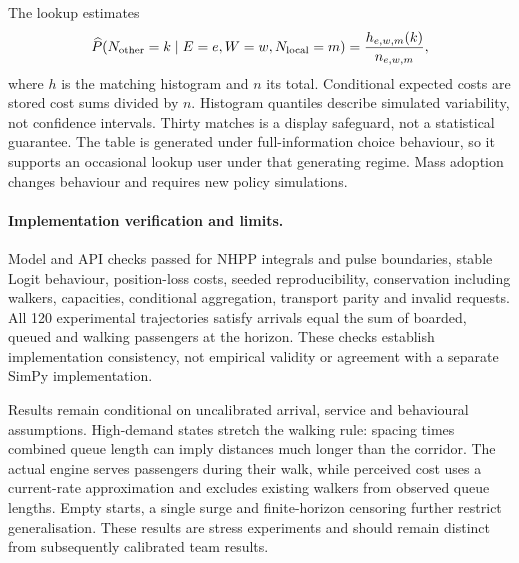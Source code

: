 The lookup estimates
\[
\widehat{P}(N_{\rm other}=k\mid E=e,W=w,N_{\rm local}=m)
=\frac{h_{e,w,m}(k)}{n_{e,w,m}},
\]
where $h$ is the matching histogram and $n$ its total. Conditional expected costs are stored cost sums divided by $n$. Histogram quantiles describe simulated variability, not confidence intervals. Thirty matches is a display safeguard, not a statistical guarantee. The table is generated under full-information choice behaviour, so it supports an occasional lookup user under that generating regime. Mass adoption changes behaviour and requires new policy simulations.

\paragraph{Implementation verification and limits.}
Model and API checks passed for NHPP integrals and pulse boundaries, stable Logit behaviour, position-loss costs, seeded reproducibility, conservation including walkers, capacities, conditional aggregation, transport parity and invalid requests. All 120 experimental trajectories satisfy arrivals equal the sum of boarded, queued and walking passengers at the horizon. These checks establish implementation consistency, not empirical validity or agreement with a separate SimPy implementation.

Results remain conditional on uncalibrated arrival, service and behavioural assumptions. High-demand states stretch the walking rule: spacing times combined queue length can imply distances much longer than the corridor. The actual engine serves passengers during their walk, while perceived cost uses a current-rate approximation and excludes existing walkers from observed queue lengths. Empty starts, a single surge and finite-horizon censoring further restrict generalisation. These results are stress experiments and should remain distinct from subsequently calibrated team results.
